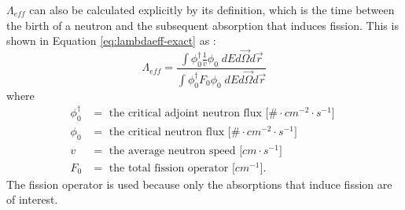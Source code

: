 
$\Lambda_{eff}$ can also be calculated explicitly by its definition, which is the time between the birth of a neutron and the subsequent absorption that induces fission.
This is shown in Equation \eqref{eq:lambdaeff-exact} as \cite{verboomen2006monte}:
\begin{equation}
    \Lambda_{eff} = \frac{\int \phi_0^\dagger \frac{1}{v} \phi_0 \; dE d\vec{\Omega} d\vec{r}}{\int \phi_0^\dagger F_0 \phi_0 \; dE d\vec{\Omega} d\vec{r}}
    \label{eq:lambdaeff-exact}
\end{equation}
where
\begin{align}
\phi_0^\dagger &= \mbox{ the critical adjoint neutron flux [$\# \cdot cm^{-2} \cdot s^{-1}$] } \nonumber \\ 
\phi_0 &= \mbox{ the critical neutron flux [$\# \cdot cm^{-2} \cdot s^{-1}$] } \nonumber \\ 
v &= \mbox{ the average neutron speed [$cm \cdot s^{-1}$]} \nonumber \\ 
F_0 &= \mbox{ the total fission operator [$cm^{-1}$].} \nonumber
\end{align}
The fission operator is used because only the absorptions that induce fission are of interest.




